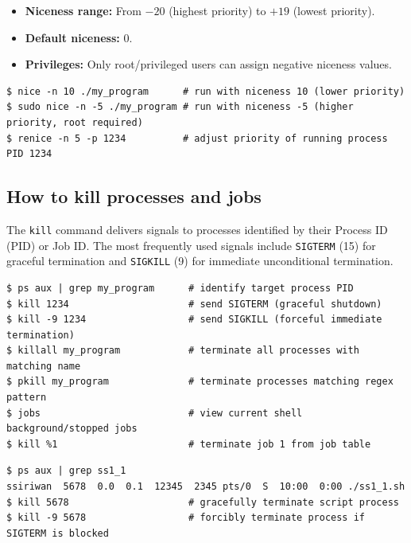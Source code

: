 \documentclass[11pt,a4paper]{article}
\begin{document}
\begin{itemize}[leftmargin=1.5em]
    \item \textbf{Niceness range:} From $-20$ (highest priority) to $+19$ (lowest priority).
    \item \textbf{Default niceness:} $0$.
    \item \textbf{Privileges:} Only root/privileged users can assign negative niceness values.
\end{itemize}

\begin{lstlisting}[style=bashstyle]
$ nice -n 10 ./my_program      # run with niceness 10 (lower priority)
$ sudo nice -n -5 ./my_program # run with niceness -5 (higher priority, root required)
$ renice -n 5 -p 1234          # adjust priority of running process PID 1234
\end{lstlisting}

\subsection{How to kill processes and jobs}

The \texttt{kill} command delivers signals to processes identified by their Process ID (PID) or Job ID. The most frequently used signals include \texttt{SIGTERM} (15) for graceful termination and \texttt{SIGKILL} (9) for immediate unconditional termination.

\begin{lstlisting}[style=bashstyle]
$ ps aux | grep my_program      # identify target process PID
$ kill 1234                     # send SIGTERM (graceful shutdown)
$ kill -9 1234                  # send SIGKILL (forceful immediate termination)
$ killall my_program            # terminate all processes with matching name
$ pkill my_program              # terminate processes matching regex pattern
$ jobs                          # view current shell background/stopped jobs
$ kill %1                       # terminate job 1 from job table
\end{lstlisting}

\begin{lstlisting}[style=termstyle]
$ ps aux | grep ss1_1
ssiriwan  5678  0.0  0.1  12345  2345 pts/0  S  10:00  0:00 ./ss1_1.sh
$ kill 5678                     # gracefully terminate script process
$ kill -9 5678                  # forcibly terminate process if SIGTERM is blocked
\end{lstlisting}

\newpage
\end{document}
